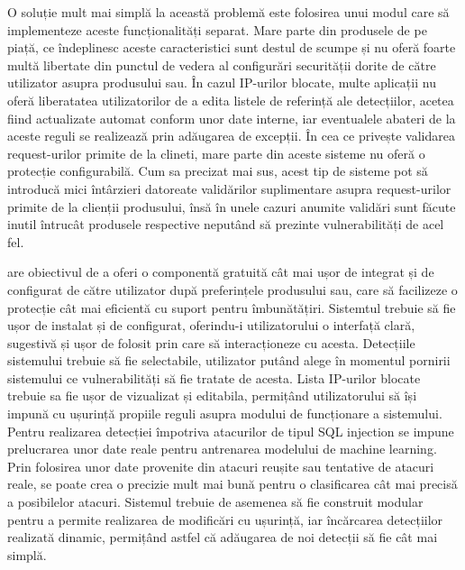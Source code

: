 O soluție mult mai simplă la această problemă este folosirea unui modul care să implementeze aceste funcționalități separat. Mare parte din produsele de pe piață, ce îndeplinesc aceste caracteristici sunt destul de scumpe și nu oferă foarte multă libertate din punctul de vedera al configurări securității dorite de către utilizator asupra produsului sau. În cazul IP-urilor blocate, multe aplicații nu oferă liberatatea utilizatorilor de a edita listele de referință ale detecțiilor, acetea fiind actualizate automat conform unor date interne, iar eventualele abateri de la aceste reguli se realizează prin adăugarea de excepții. În cea ce privește validarea request-urilor primite de la clineti, mare parte din aceste sisteme nu oferă o protecție configurabilă. Cum sa precizat mai sus, acest tip de sisteme pot să introducă mici întârzieri datoreate validărilor suplimentare asupra request-urilor primite de la clienții produsului, însă în unele cazuri anumite validări sunt făcute inutil întrucât produsele respective neputând să prezinte vulnerabilități de acel fel. 

 \textit{\thesistitle}  are obiectivul de a oferi o componentă gratuită cât mai ușor de integrat și de configurat de către utilizator după preferințele produsului sau, care să facilizeze o protecție cât mai eficientă cu suport pentru îmbunătățiri. Sistemtul trebuie să fie ușor de instalat și de configurat, oferindu-i utilizatorului o interfață clară, sugestivă și ușor de folosit prin care să interacționeze cu acesta. Detecțiile sistemului trebuie să fie selectabile, utilizator putând alege în momentul pornirii sistemului ce vulnerabilități să fie tratate de acesta. Lista IP-urilor blocate trebuie sa fie ușor de vizualizat și editabila, permițând utilizatorului să își impună cu ușurință propiile reguli asupra modului de funcționare a sistemului. Pentru realizarea detecției împotriva atacurilor de tipul SQL injection se impune prelucrarea unor date reale pentru antrenarea modelului de machine learning. Prin folosirea unor date provenite din atacuri reușite sau tentative de atacuri reale, se poate crea o precizie mult mai bună pentru o clasificarea cât mai precisă a posibilelor atacuri. Sistemul trebuie de asemenea să fie construit modular pentru a permite realizarea de modificări cu ușurință, iar încărcarea detecțiilor realizată dinamic, permițând astfel că adăugarea de noi detecții să fie cât mai simplă. 




